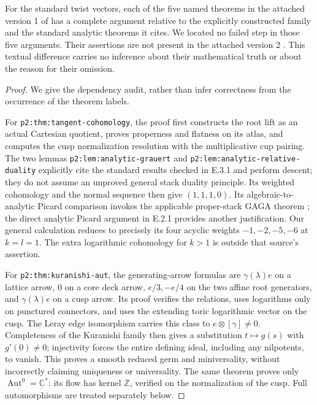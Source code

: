\begin{proposition}\label{push:src:E.3.2}
For the standard twist vectors, each of the five named theorems
in the attached version 1 of \cite{DGKXv1push} has a complete
argument relative to the explicitly constructed family and the
standard analytic theorems it cites.  We located no failed step
in those five arguments.  Their assertions are not present in
the attached version 2 \cite{DGKXv2push}.  This textual
difference carries no inference about their mathematical truth
or about the reason for their omission.
\end{proposition}
\begin{proof}
We give the dependency audit, rather than infer correctness from
the occurrence of the theorem labels.

For \texttt{p2:thm:tangent-cohomology}, the proof first constructs
the root lift as an actual Cartesian quotient, proves properness
and flatness on its atlas, and computes the cusp normalization
resolution with the multiplicative cup pairing.  The two lemmas
\texttt{p2:lem:analytic-grauert} and
\texttt{p2:lem:analytic-relative-duality} explicitly cite the
standard results checked in E.3.1 and perform descent; they do
not assume an unproved general stack duality principle.  Its
weighted cohomology and the normal sequence then give
$(1,1,1,0)$.  Its algebraic-to-analytic Picard comparison invokes
the applicable proper-stack GAGA theorem
\cite[Theorem 7.4]{PY16push}; the direct analytic Picard
argument in E.2.1 provides another justification.  Our general
calculation reduces to precisely its four acyclic weights
$-1,-2,-5,-6$ at $k=l=1$.  The extra logarithmic cohomology
for $k>1$ is outside that source's assertion.

For \texttt{p2:thm:kuranishi-aut}, the generating-arrow formulas
are $\gamma(\lambda)e$ on a lattice arrow, $0$ on a core deck
arrow, $e/3,-e/4$ on the two affine root generators, and
$\gamma(\lambda)e$ on a cusp arrow.  Its proof verifies the
relations, uses logarithms only on punctured connectors, and
uses the extending toric logarithmic vector on the cusp.
The Leray edge isomorphism carries this class to
$e\otimes[\gamma]\ne0$.  Completeness of the Kuranishi family
then gives a substitution $t\mapsto g(s)$ with $g'(0)\ne0$;
injectivity forces the entire defining ideal, including any
nilpotents, to vanish.  This proves a smooth reduced germ and
miniversality, without incorrectly claiming uniqueness or
universality.  The same theorem proves only
$\operatorname{Aut}^0=\mathbb C^*$: its flow has kernel
$\mathbb Z$, verified on the normalization of the cusp.  Full
automorphisms are treated separately below.


\end{proof}

